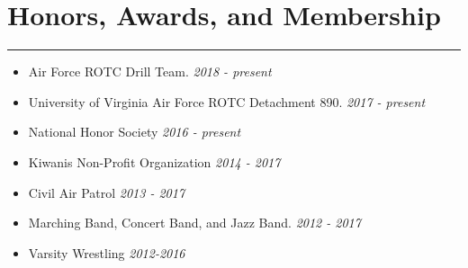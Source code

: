 \documentclass[a4paper]{article}
\begin{document}
\section*{Honors, Awards, and Membership}
\hrule
\vspace{3mm}
\begin{itemize}
	\setlength\itemsep{-0.7mm}
	\item Air Force ROTC Drill Team.
	\hfill \textit{2018 - present}
	\item University of Virginia Air Force ROTC Detachment 890.
	\hfill \textit{2017 - present}
	\item National Honor Society
	\hfill \textit{2016 - present}
	\item Kiwanis Non-Profit Organization
	\hfill \textit{2014 - 2017}
	\item Civil Air Patrol
	\hfill \textit{2013 - 2017}
	\item Marching Band, Concert Band, and Jazz Band.
	\hfill \textit{2012 - 2017}
	\item Varsity Wrestling
	\hfill \textit{2012-2016}
\end{itemize}
\end{document}
